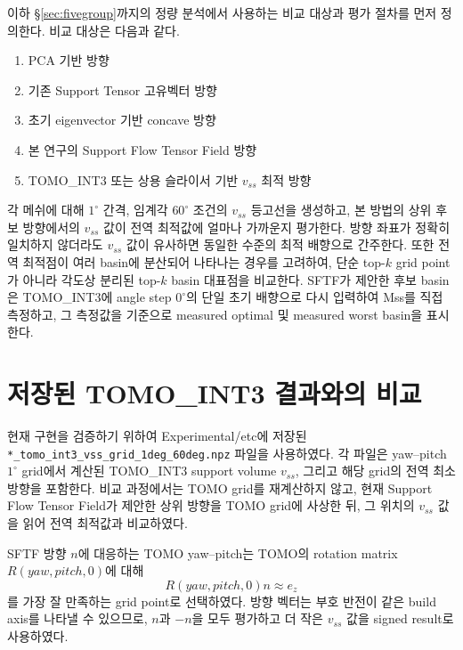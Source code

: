 \documentclass[11pt,a4paper]{article}
\begin{document}
이하 \S\ref{sec:fivegroup}까지의 정량 분석에서 사용하는 비교 대상과 평가 절차를 먼저 정의한다.
비교 대상은 다음과 같다.

\begin{enumerate}
\item PCA 기반 방향
\item 기존 Support Tensor 고유벡터 방향
\item 초기 eigenvector 기반 concave 방향
\item 본 연구의 Support Flow Tensor Field 방향
\item TOMO\_INT3 또는 상용 슬라이서 기반 $v_{ss}$ 최적 방향
\end{enumerate}

각 메쉬에 대해 $1^\circ$ 간격, 임계각 $60^\circ$ 조건의 $v_{ss}$ 등고선을 생성하고,
본 방법의 상위 후보 방향에서의 $v_{ss}$ 값이 전역 최적값에 얼마나 가까운지 평가한다.
방향 좌표가 정확히 일치하지 않더라도 $v_{ss}$ 값이 유사하면 동일한 수준의 최적 배향으로 간주한다.
또한 전역 최적점이 여러 basin에 분산되어 나타나는 경우를 고려하여,
단순 top-$k$ grid point가 아니라 각도상 분리된 top-$k$ basin 대표점을 비교한다.
SFTF가 제안한 후보 basin은 TOMO\_INT3에 angle step $0^\circ$의 단일 초기 배향으로 다시 입력하여
Mss를 직접 측정하고,
그 측정값을 기준으로 measured optimal 및 measured worst basin을 표시한다.

\section{저장된 TOMO\_INT3 결과와의 비교}

현재 구현을 검증하기 위하여 Experimental/etc에 저장된
\texttt{*\_tomo\_int3\_vss\_grid\_1deg\_60deg.npz} 파일을 사용하였다.
각 파일은 yaw--pitch $1^\circ$ grid에서 계산된 TOMO\_INT3 support volume $v_{ss}$,
그리고 해당 grid의 전역 최소 방향을 포함한다.
비교 과정에서는 TOMO grid를 재계산하지 않고,
현재 Support Flow Tensor Field가 제안한 상위 방향을 TOMO grid에 사상한 뒤,
그 위치의 $v_{ss}$ 값을 읽어 전역 최적값과 비교하였다.

SFTF 방향 $n$에 대응하는 TOMO yaw--pitch는 TOMO의 rotation matrix $R(yaw,pitch,0)$에 대해
\begin{equation}
R(yaw,pitch,0)n \approx e_z
\end{equation}
를 가장 잘 만족하는 grid point로 선택하였다.
방향 벡터는 부호 반전이 같은 build axis를 나타낼 수 있으므로,
$n$과 $-n$을 모두 평가하고 더 작은 $v_{ss}$ 값을 signed result로 사용하였다.
\end{document}
